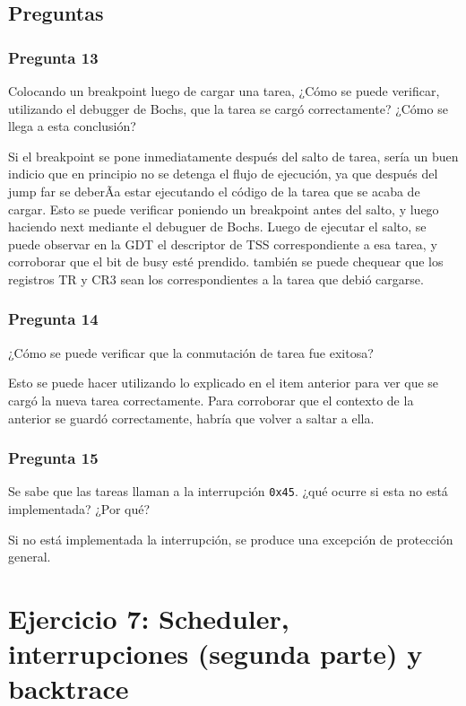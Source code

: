 \documentclass[10pt, a4paper]{article}
\begin{document}
\subsection{Preguntas}
\subsubsection*{Pregunta 13}
 \begin{framed}
Colocando un breakpoint luego de cargar una tarea, ¿Cómo se puede verificar, utilizando el debugger de Bochs, que la tarea se cargó correctamente?
¿Cómo se llega a esta conclusión?
\end{framed}
Si el breakpoint se pone inmediatamente después del salto de tarea, sería un buen indicio que en principio no se detenga el flujo de ejecución, ya que
después del jump far se deberÃ­a estar ejecutando el código de la tarea que se acaba de cargar. Esto se puede verificar poniendo un breakpoint antes del salto, y luego 
haciendo  next mediante el debuguer de Bochs. Luego de ejecutar el salto, se puede observar en la GDT el descriptor de TSS correspondiente a esa tarea, y corroborar
que el bit de busy esté prendido. también se puede chequear que los registros TR y CR3 sean los correspondientes a la tarea que debió cargarse.
\subsubsection*{Pregunta 14}
 \begin{framed}
¿Cómo se puede verificar que la conmutación de tarea fue exitosa?
\end{framed}
Esto se puede hacer utilizando lo explicado en el item anterior para ver que se cargó la nueva tarea correctamente. Para corroborar que el contexto de la anterior se guardó correctamente, habría que volver a saltar a ella.

\subsubsection*{Pregunta 15}
 \begin{framed}
Se sabe que las tareas llaman a la interrupción \texttt{0x45}. ¿qué ocurre si esta no está implementada? ¿Por qué?
\end{framed}
Si no está implementada la interrupción, se produce una excepción de protección general.
\section{Ejercicio 7: Scheduler, interrupciones (segunda parte) y backtrace}
\end{document}
